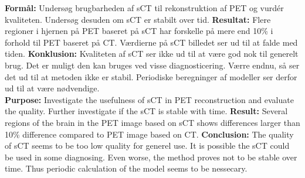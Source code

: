 \abstract

\textbf{Formål:} Undersøg brugbarheden af sCT til rekonstruktion af PET og vurdér kvaliteten. Undersøg desuden om sCT er stabilt over tid. \textbf{Resultat:} Flere regioner i hjernen på PET baseret på sCT har forskelle på mere end 10\% i forhold til PET baseret på CT. Værdierne på sCT billedet ser ud til at falde med tiden. \textbf{Konklusion:} Kvaliteten af sCT ser ikke ud til at være god nok til generelt brug. Det er muligt den kan bruges ved visse diagnosticering. Værre endnu, så ser det ud til at metoden ikke er stabil. Periodiske beregninger af modeller ser derfor ud til at være nødvendige.\\

\textbf{Purpose:} Investigate the usefulness of sCT in PET reconstruction and evaluate the quality. Further investigate if the sCT is stable with time. \textbf{Result:} Several regions of the brain in the PET image based on sCT shows differences larger than 10\% difference compared to PET image based on CT. \textbf{Conclusion:} The quality of sCT seems to be too low quality for generel use. It is possible the sCT could be used in some diagnosing. Even worse, the method proves not to be stable over time. Thus periodic calculation of the model seems to be nessecary.